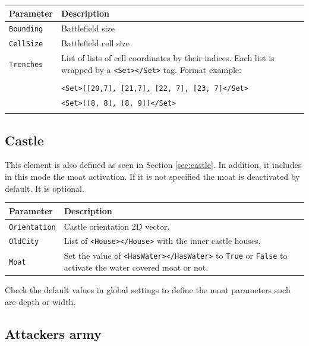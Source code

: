 \documentclass[tog]{acmsiggraph}
\begin{document}
\begin{tabularx}{0.48\textwidth}{ |l|X| }
\hline 
\textbf{Parameter} & \textbf{Description} \\[0.15cm]
 \hline
 \texttt{Bounding} & Battlefield size \\
 \hline
 \texttt{CellSize} & Battlefield cell size \\
 \hline
 \texttt{Trenches} & List of lists of cell coordinates by their indices. Each list is wrapped by a \texttt{<Set></Set>} tag. Format example: \\
 & \\
 & \texttt{<Set>[[20,7], [21,7], [22, 7], [23, 7]</Set>} \\
 & \texttt{<Set>[[8, 8], [8, 9]]</Set>} \\
 & \\
 \hline
\end{tabularx} 




\subsection{Castle}
\label{sec:battlecastle}

This element is also defined as seen in Section \ref{sec:castle}.
In addition, it includes in this mode the moat activation. If it is not specified the moat is deactivated by default. It is optional.

\begin{tabularx}{0.48\textwidth}{ |l|X| }
\hline 
\textbf{Parameter} & \textbf{Description} \\[0.15cm]
 \hline
 \texttt{Orientation} & Castle orientation 2D vector. \\
 \hline
 \texttt{OldCity} & List of \texttt{<House></House>} with the inner castle houses. \\
 \hline
 \texttt{Moat} & Set the value of \texttt{<HasWater></HasWater>} to \texttt{True} or \texttt{False} to activate the water covered moat or not. \\
 \hline
\end{tabularx} 
 
Check the default values in global settings to define the moat parameters such are depth or width.



\subsection{Attackers army}
\label{sec:battleattackers}
\end{document}
